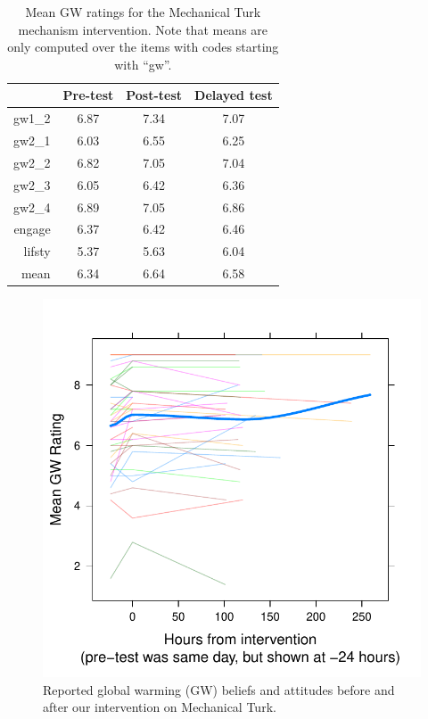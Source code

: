 \begin{table}
\caption{Mean GW ratings for the Mechanical Turk mechanism intervention. Note
    that means are only computed over the items with codes starting with
    “\textsf{gw}”.}
\label{table:CCO-mech-gw-means}
\centering
\begin{tabular}{>{\sffamily}rccc}
  \toprule
         & Pre-test & Post-test & Delayed test \\ 
  \midrule
  gw1_2 & 6.87 & 7.34 & 7.07 \\ 
  gw2_1 & 6.03 & 6.55 & 6.25 \\ 
  gw2_2 & 6.82 & 7.05 & 7.04 \\ 
  gw2_3 & 6.05 & 6.42 & 6.36 \\ 
  gw2_4 & 6.89 & 7.05 & 6.86 \\ 
  engage & 6.37 & 6.42 & 6.46 \\ 
  lifsty & 5.37 & 5.63 & 6.04 \\ 
  \midrule
  mean & 6.34 & 6.64 & 6.58 \\
   \bottomrule
\end{tabular}
\end{table}

\begin{figure}
    \centering
    \includegraphics{CCO-mech-GW.pdf}
    \caption{Reported global warming (GW) beliefs and attitudes before and after
        our intervention on Mechanical Turk.}
    \label{fig:CCO-mech-GW}
\end{figure}


